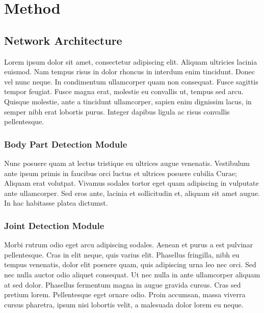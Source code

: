 

\chapter{Method} %

\label{Method} %



\section{Network Architecture}

Lorem ipsum dolor sit amet, consectetur adipiscing elit. Aliquam ultricies lacinia euismod. Nam tempus risus in dolor
rhoncus in interdum enim tincidunt. Donec vel nunc neque. In condimentum ullamcorper quam non consequat. Fusce
sagittis tempor feugiat. Fusce magna erat, molestie eu convallis ut, tempus sed arcu. Quisque molestie, ante a
tincidunt ullamcorper, sapien enim dignissim lacus, in semper nibh erat lobortis purus. Integer dapibus ligula ac
risus convallis pellentesque.


\subsection{Body Part Detection Module}

Nunc posuere quam at lectus tristique eu ultrices augue venenatis. Vestibulum ante ipsum primis in faucibus orci
luctus et ultrices posuere cubilia Curae; Aliquam erat volutpat. Vivamus sodales tortor eget quam adipiscing in
vulputate ante ullamcorper. Sed eros ante, lacinia et sollicitudin et, aliquam sit amet augue. In hac habitasse
platea dictumst.


\subsection{Joint Detection Module}
Morbi rutrum odio eget arcu adipiscing sodales. Aenean et purus a est pulvinar pellentesque. Cras in elit neque, quis
varius elit. Phasellus fringilla, nibh eu tempus venenatis, dolor elit posuere quam, quis adipiscing urna leo nec
orci. Sed nec nulla auctor odio aliquet consequat. Ut nec nulla in ante ullamcorper aliquam at sed dolor. Phasellus
fermentum magna in augue gravida cursus. Cras sed pretium lorem. Pellentesque eget ornare odio. Proin accumsan, massa
viverra cursus pharetra, ipsum nisi lobortis velit, a malesuada dolor lorem eu neque.

